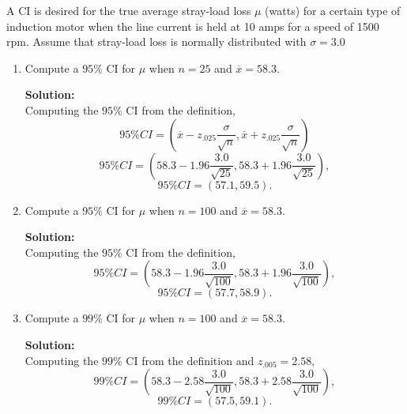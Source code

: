 \documentclass[12pt]{article}
\makeatletter
\theoremstyle{homework}
\newenvironment{exercise}[1]
{\def\@currentlabel{#1}\exercisecore}
{\endexercisecore}
\newcommand{\localhead}[1]{\par\smallskip\noindent\textbf{#1}\nobreak\\}%
\newcommand\solution{\localhead{Solution:}}
\makeatother
\begin{document}
\begin{exercise}{7.4} A  CI  is  desired  for  the  true  average  stray-load  loss  $\mu$ (watts)  for  a 
   certain  type  of  induction  motor  when  the  line current is held at 10 amps for a speed of 1500 rpm.
    Assume that stray-load loss is normally distributed with $\sigma = 3.0$\\
    \begin{enumerate}
      \item Compute a $95\%$ CI for $\mu$ when $n = 25$ and $\overline{x} = 58.3$.\\
      \solution Computing the $95\%$ CI from the definition,
      \begin{equation*}
        95\% CI = (\overline{x} - z_{.025}\dfrac{\sigma}{\sqrt{n}}, \overline{x} + z_{.025}\dfrac{\sigma}{\sqrt{n}})
      \end{equation*}
      \begin{equation*}
        95\% CI = (58.3 - 1.96 \dfrac{3.0}{\sqrt{25}}, 58.3 + 1.96 \dfrac{3.0}{\sqrt{25}}),
      \end{equation*}
      \begin{equation*}
        95\% CI = (57.1, 59.5).
      \end{equation*}
      \vspace{.25in}
    


      \item Compute a $95\%$ CI for $\mu$ when $n = 100$ and $\overline{x} = 58.3$.\\
      \solution Computing the $95\%$ CI from the definition,
      \begin{equation*}
        95\% CI = (58.3 - 1.96 \dfrac{3.0}{\sqrt{100}}, 58.3 + 1.96 \dfrac{3.0}{\sqrt{100}}),
      \end{equation*}
      \begin{equation*}
        95\% CI = (57.7, 58.9).
      \end{equation*}
      \vspace{.25in}
    


      \item Compute a $99\%$ CI for $\mu$ when $n = 100$ and $\overline{x} = 58.3$.\\
      \solution Computing the $99\%$ CI from the definition and $z_{.005} = 2.58$,
      \begin{equation*}
        99\% CI = (58.3 -  2.58 \dfrac{3.0}{\sqrt{100}}, 58.3 + 2.58\dfrac{3.0}{\sqrt{100}}),
      \end{equation*}
      \begin{equation*}
        99\% CI = (57.5, 59.1).
      \end{equation*}
      \vspace{.25in}



\end{enumerate}
\end{exercise}
\end{document}
